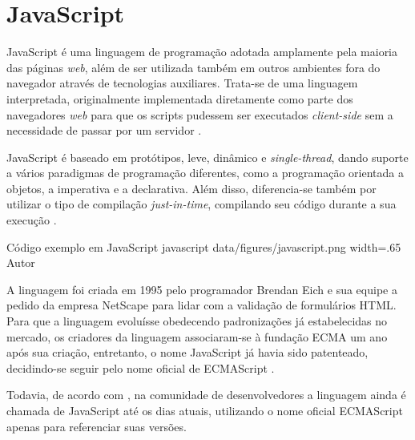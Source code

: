 \section{JavaScript}
\label{sec:javascript}
JavaScript é uma linguagem de programação adotada amplamente pela maioria das páginas \textit{web}, além de ser utilizada também em outros ambientes fora do navegador através de tecnologias auxiliares. Trata-se de uma linguagem interpretada, originalmente implementada diretamente como parte dos navegadores \textit{web} para que os scripts pudessem ser executados \textit{client-side} sem a necessidade de passar por um servidor \cite{Mozilla2023}.

JavaScript é baseado em protótipos, leve, dinâmico e \textit{single-thread}, dando suporte a vários paradigmas de programação diferentes, como a programação orientada a objetos, a imperativa e a declarativa. Além disso, diferencia-se também por utilizar o tipo de compilação \textit{just-in-time}, compilando seu código durante a sua execução \cite{Mozilla2023}.

\image
    {Código exemplo em JavaScript}
    {javascript}
    {data/figures/javascript.png}
    {width=.65\textwidth}
    {Autor}

A linguagem foi criada em 1995 pelo programador Brendan Eich e sua equipe a pedido da empresa NetScape para lidar com a validação de formulários HTML. Para que a linguagem evoluísse obedecendo padronizações já estabelecidas no mercado, os criadores da linguagem associaram-se à fundação ECMA um ano após sua criação, entretanto, o nome JavaScript já havia sido patenteado, decidindo-se seguir pelo nome oficial de ECMAScript \cite{Malavasi2017}.

Todavia, de acordo com , na comunidade de desenvolvedores a linguagem ainda é chamada de JavaScript até os dias atuais, utilizando o nome oficial ECMAScript apenas para referenciar suas versões.
